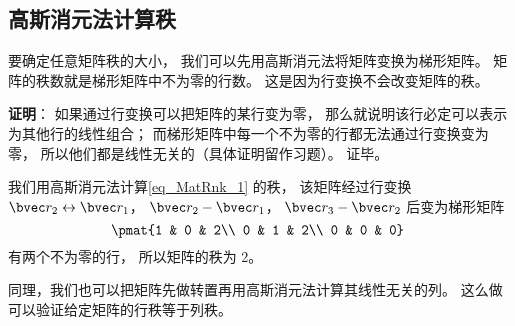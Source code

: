 \subsection{高斯消元法计算秩}
要确定任意矩阵秩的大小， 我们可以先用高斯消元法将矩阵变换为梯形矩阵。 矩阵的秩数就是梯形矩阵中不为零的行数。 这是因为行变换不会改变矩阵的秩。

\textbf{证明}： 如果通过行变换可以把矩阵的某行变为零， 那么就说明该行必定可以表示为其他行的线性组合； 而梯形矩阵中每一个不为零的行都无法通过行变换变为零， 所以他们都是线性无关的（具体证明留作习题）。 证毕。

\begin{example}{}
我们用高斯消元法计算\autoref{eq_MatRnk_1} 的秩， 该矩阵经过行变换 $\bvec r_2 \leftrightarrow \bvec r_1$， $\bvec r_2 - \bvec r_1$， $\bvec r_3 - \bvec r_2$ 后变为梯形矩阵
\begin{equation}
\pmat{1 & 0 & 2\\ 0 & 1 & 2\\ 0 & 0 & 0}~
\end{equation}
有两个不为零的行， 所以矩阵的秩为 2。
\end{example}

同理，我们也可以把矩阵先做转置再用高斯消元法计算其线性无关的列。 这么做可以验证给定矩阵的行秩等于列秩。


